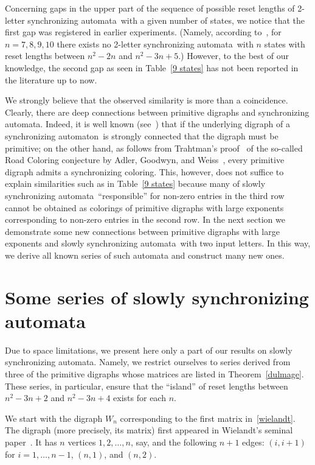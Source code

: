 \documentclass[11pt]{llncs}
\newcommand{\sa}{synchronizing automata}
\newcommand{\san}{synchronizing automaton}
\begin{document}
Concerning gaps in the upper part of the sequence of possible reset lengths of
2-letter \sa\ with a given number of states, we notice that the first gap was
registered in earlier experiments. (Namely, according to~\cite{Tr06,Tr06a},
for $n=7,8,9,10$ there exists no 2-letter \sa\ with $n$ states with reset lengths
between $n^2-2n$ and $n^2-3n+5$.) However, to the best of our knowledge, the second
gap as seen in Table~\ref{9 states} has not been reported in the literature up to now.

We strongly believe that the observed similarity is more than a coincidence.
Clearly, there are deep connections between primitive digraphs and \sa. Indeed,
it is well known (see~\cite{AGW}) that if the underlying digraph of a \san\
is strongly connected that the digraph must be primitive; on the other hand,
as follows from Trahtman's proof~\cite{Tr09} of the so-called Road Coloring
conjecture by Adler, Goodwyn, and Weiss~\cite{AGW}, every primitive digraph
admits a synchronizing coloring. This, however, does not suffice to explain
similarities such as in Table~\ref{9 states} because many of slowly \sa\
``responsible'' for non-zero entries in the third row cannot be obtained
as colorings of primitive digraphs with large exponents corresponding
to non-zero entries in the second row. In the next section we demonstrate
some new connections between primitive digraphs with large exponents and
slowly \sa\ with two input letters. In this way, we derive all known
series of such automata and construct many new ones.

\section{Some series of slowly \sa}
\label{sss}

Due to space limitations, we present here only a part of our results on slowly \sa.
Namely, we restrict ourselves to series derived from three of the primitive digraphs
whose matrices are listed in Theorem~\ref{dulmage}. These series, in particular,
ensure that the ``island'' of reset lengths between $n^2-3n+2$ and
$n^2-3n+4$ exists for each $n$.

We start with the digraph $W_n$ corresponding to the first matrix in~\eqref{wielandt}.
The digraph (more precisely, its matrix) first appeared in Wielandt's seminal paper~\cite{Wi50}.
It has $n$ vertices $1,2,\dots,n$, say, and the following $n+1$ edges: $(i,i+1)$ for
$i=1,\dots,n-1$, $(n,1)$, and $(n,2)$.
\end{document}
